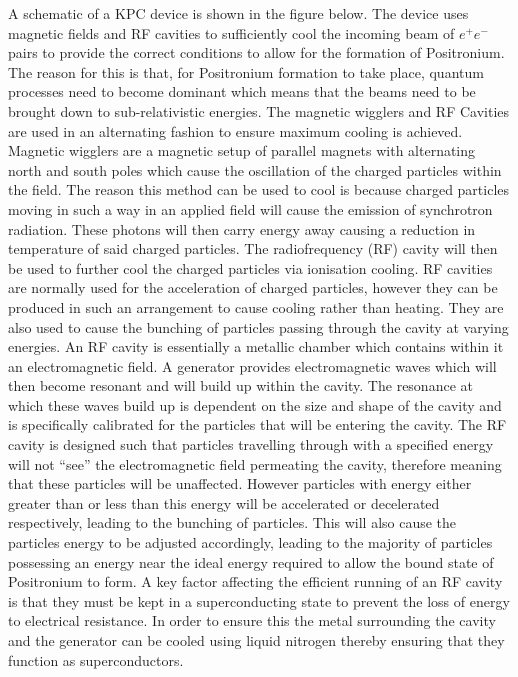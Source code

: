 A schematic of a KPC device is shown in the figure below. The device uses magnetic fields and RF cavities to sufficiently cool the incoming beam of $e^+e^-$  pairs to provide the correct conditions to allow for the formation of Positronium. The reason for this is that, for Positronium formation to take place, quantum processes need to become dominant which means that the beams need to be brought down to sub-relativistic energies. The magnetic wigglers and RF Cavities are used in an alternating fashion to ensure maximum cooling is achieved. Magnetic wigglers are a magnetic setup of parallel magnets with alternating north and south poles which cause the oscillation of the charged particles within the field. The reason this method can be used to cool is because charged particles moving in such a way in an applied field will cause the emission of synchrotron radiation. These photons will then carry energy away causing a reduction in temperature of said charged particles. The radiofrequency (RF) cavity will then be used to further cool the charged particles via ionisation cooling. RF cavities are normally used for the acceleration of charged particles, however they can be produced in such an arrangement to cause cooling rather than heating. They are also used to cause the bunching of particles passing through the cavity at varying energies. An RF cavity is essentially a metallic chamber which contains within it an electromagnetic field. A generator provides electromagnetic waves which will then become resonant and will build up within the cavity. The resonance at which these waves build up is dependent on the size and shape of the cavity and is specifically calibrated for the particles that will be entering the cavity. The RF cavity is designed such that particles travelling through with a specified energy will not “see” the electromagnetic field permeating the cavity, therefore meaning that these particles will be unaffected. However particles with energy either greater than or less than this energy will be accelerated or decelerated respectively, leading to the bunching of particles. This will also cause the particles energy to be adjusted accordingly, leading to the majority of particles possessing an energy near the ideal energy required to allow the bound state of Positronium to form. A key  factor affecting the efficient running of an RF cavity is that they must be kept in a superconducting state to prevent the loss of energy to electrical resistance. In order to ensure this the metal surrounding the cavity and the generator can be cooled using liquid nitrogen thereby ensuring that they function as superconductors.    
